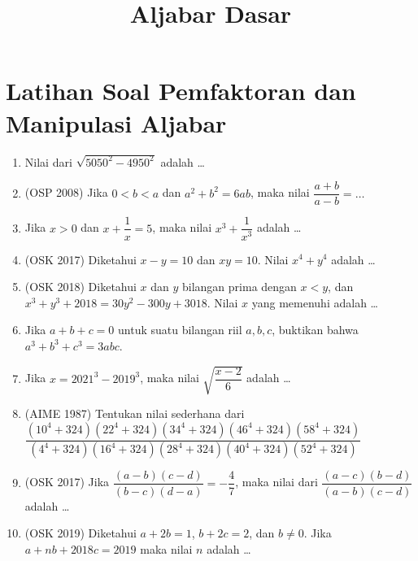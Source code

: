 \documentclass[12pt]{scrartcl}
\begin{document}
\title{Aljabar Dasar}
\maketitle

\renewcommand*\contentsname{Daftar Isi}
\tableofcontents

\newpage
\section{Latihan Soal Pemfaktoran dan Manipulasi Aljabar}
\begin{enumerate}
    \item  Nilai dari $\sqrt{5050^2-4950^2}$ adalah \dots

    \item (OSP 2008) Jika $0 < b < a$ dan $a^2+b^2=6ab$, maka nilai $\dfrac{a+b}{a-b}=\dots$
    
    \item Jika $x > 0$ dan $x + \dfrac{1}{x} =  5$, maka nilai $x^3+\dfrac{1}{x^3}$ adalah \dots
    
    \item (OSK 2017) Diketahui $x-y=10$ dan $xy=10$. Nilai $x^4+y^4$ adalah \dots
    
    \item (OSK 2018) Diketahui $x$ dan $y$ bilangan prima dengan $x < y$, dan $x^3+y^3+2018=30y^2-300y+3018$. Nilai $x$ yang memenuhi adalah \dots
    
    \item Jika $a+b+c=0$ untuk suatu bilangan riil $a,b,c$, buktikan bahwa $a^3+b^3+c^3=3abc$.
    
    \item Jika $x=2021^3-2019^3$, maka nilai $\sqrt{\dfrac{x-2}{6}}$ adalah \dots

    \item (AIME 1987)
    Tentukan nilai sederhana dari $\dfrac{(10^4+324)(22^4+324)(34^4+324)(46^4+324)(58^4+324)}{(4^4+324)(16^4+324)(28^4+324)(40^4+324)(52^4+324)}$

    \item (OSK 2017) Jika $\dfrac{(a-b)(c-d)}{(b-c)(d-a)}=-\dfrac{4}{7}$, maka nilai dari $\dfrac{(a-c)(b-d)}{(a-b)(c-d)}$ adalah \dots

    \item (OSK 2019) Diketahui $a+2b=1$, $b+2c=2$, dan $b \neq 0$. Jika $a+nb+2018c = 2019$ maka nilai $n$ adalah \dots


\end{enumerate}
\end{document}
